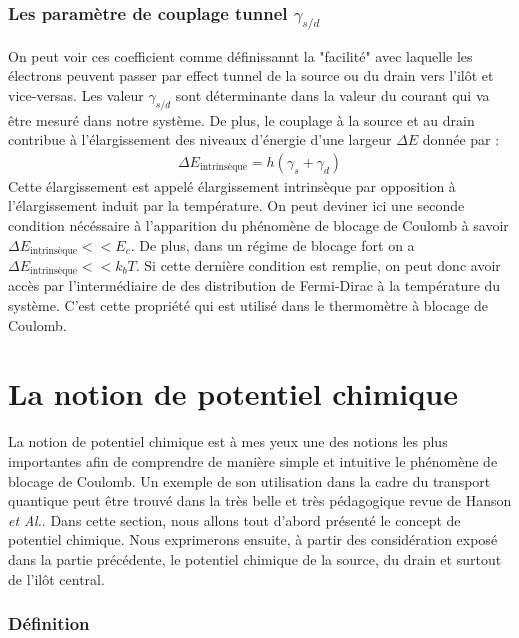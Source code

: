 \subsubsection{Les paramètre de couplage tunnel $\gamma_{s/d}$}
On peut voir ces coefficient comme définissannt la "facilité" avec laquelle les électrons peuvent passer par effect tunnel de la source ou du drain vers l'il\^ot et vice-versas. Les valeur $\gamma_{s/d}$ sont déterminante dans la valeur du courant qui va \^etre mesuré dans notre système. De plus, le couplage à la source et au drain contribue à l'élargissement des niveaux d'énergie d'une largeur $\Delta E$ donnée par :
\begin{eqnarray}
\Delta E_{\text{intrinsèque}} = h (\gamma_s + \gamma_d)
\end{eqnarray}
Cette élargissement est appelé élargissement intrinsèque par opposition à l'élargissement induit par la température. On peut deviner ici une seconde condition nécéssaire à l'apparition du phénomène de blocage de Coulomb à savoir $\Delta E_{\text{intrinsèque}} << E_c$. De plus, dans un régime de blocage fort on a $\Delta E_{\text{intrinsèque}} << k_bT$. Si cette dernière condition est remplie, on peut donc avoir accès par l'intermédiaire de des distribution de Fermi-Dirac à la température du système. C'est cette propriété qui est utilisé dans le thermomètre à blocage de Coulomb.





\section{La notion de potentiel chimique}
La notion de potentiel chimique est à mes yeux une des notions les plus importantes afin de comprendre de manière simple et intuitive le phénomène de blocage de Coulomb. Un exemple de son utilisation dans la cadre du transport quantique peut \^etre trouvé dans la très belle et très pédagogique revue de Hanson \textit{et Al.}. Dans cette section, nous allons tout d'abord présenté le concept de potentiel chimique. Nous exprimerons ensuite, à partir des considération exposé dans la partie précédente, le potentiel chimique de la source, du drain et surtout de l'ilôt central.

\subsubsection{Définition}

